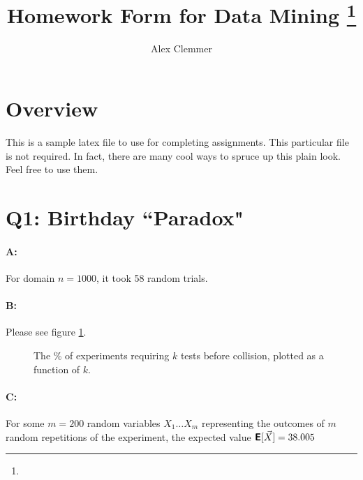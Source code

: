 \documentclass[11pt]{article}
\title{Homework Form for Data Mining
\footnote{\s{CS 6955 Data Mining; \;\; Spring 2012 \hfill
Instructor: Jeff M. Phillips, University of Utah}
}
}
\author{Alex Clemmer}
\newcommand{\E}{\textbf{\textsf{E}}}
\begin{document}
\maketitle





\section{Overview}

This is a sample latex file to use for completing assignments.  This particular file is not required.  In fact, there are many cool ways to spruce up this plain look.  Feel free to use them.  

\section{Q1: Birthday ``Paradox"}

\paragraph*{A:} For domain $n = 1000$, it took 58 random trials.

\paragraph*{B:} Please see figure \ref{fig:cdp1}.

\begin{figure}[h]
\caption{The \% of experiments requiring $k$ tests before collision, plotted as a function of $k$.}
\label{fig:cdp1}
\end{figure}

\paragraph*{C:} For some $m = 200$ random variables $X_1 \ldots X_m$ representing the outcomes of $m$ random repetitions of the experiment, the expected value $\E[\vec{X}] = 38.005$
\end{document}
